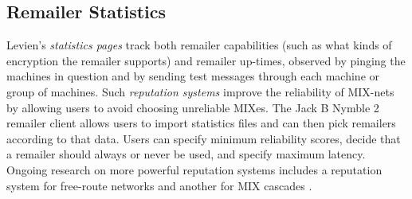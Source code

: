 \documentclass{llncs}
\begin{document}
%
%

\subsection{Remailer Statistics}

Levien's \emph{statistics pages} \cite{levien} track both remailer
capabilities (such as what kinds of encryption the remailer supports)
and remailer up-times, observed by pinging the machines in question
and by sending test messages through each machine or group of machines.
Such \emph{reputation systems} improve the reliability of MIX-nets by
allowing users to avoid choosing unreliable MIXes. The Jack B Nymble 2
remailer client \cite{potato} allows users to import statistics files
and can then pick remailers according to that data. Users can specify
minimum reliability scores, decide that a remailer should always or never
be used, and specify maximum latency. Ongoing research on more powerful
reputation systems includes a reputation system for free-route networks
\cite{mix-acc} and another for MIX cascades \cite{casc-rep}.
\end{document}
